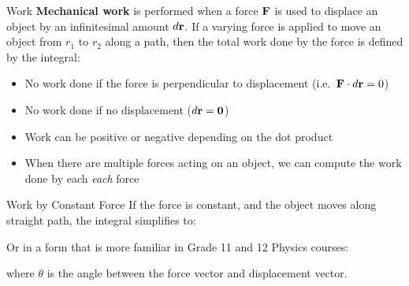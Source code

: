 \documentclass[12pt,compress,aspectratio=169]{beamer}
\newcommand{\mb}[1]{\ensuremath\mathbf{#1}}
\newcommand{\eq}[2]{\vspace{#1}{\Large\begin{displaymath}#2\end{displaymath}}}
\begin{document}
\begin{frame}{Work}
  \textbf{Mechanical work} is performed when a force $\mb{F}$ is used to
  displace an object by an infinitesimal amount $d\mb{r}$. If a varying force
  is applied to move an object from $r_1$ to $r_2$ along a path, then the total
  work done by the force is defined by the integral:

  \eq{-.2in}{
    \boxed{W=\int_{r_1}^{r_2}\mb{F}(r)\cdot d\mb{r}}
  }

  \begin{itemize}
  \item No work done if the force is perpendicular to displacement
    (i.e.\ $\mb{F}\cdot d\mb{r}=0$)
  \item No work done if no displacement ($d\mb{r}=\mb{0}$)
  \item Work can be positive or negative depending on the dot product
  \item When there are multiple forces acting on an object, we can compute the
    work done by each \emph{each} force
  \end{itemize}
\end{frame}



\begin{frame}{Work by Constant Force}
  If the force is constant, and the object moves along straight path, the
  integral simplifies to:

  \eq{-.2in}{
    \boxed{W=\mb{F}\cdot\Delta\mb{r}}
  }

  Or in a form that is more familiar in Grade 11 and 12 Physics courses:

  \eq{-.2in}{
    \boxed{W=F\Delta r\cos\theta}
  }

  where $\theta$ is the angle between the force vector and displacement vector.
\end{frame}
\end{document}
